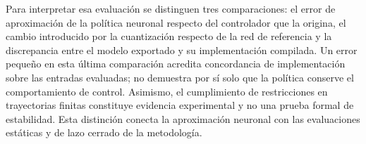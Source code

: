 Para interpretar esa evaluación se distinguen tres comparaciones: el error de aproximación de la política neuronal respecto del controlador que la origina, el cambio introducido por la cuantización respecto de la red de referencia y la discrepancia entre el modelo exportado y su implementación compilada. Un error pequeño en esta última comparación acredita concordancia de implementación sobre las entradas evaluadas; no demuestra por sí solo que la política conserve el comportamiento de control. Asimismo, el cumplimiento de restricciones en trayectorias finitas constituye evidencia experimental y no una prueba formal de estabilidad. Esta distinción conecta la aproximación neuronal con las evaluaciones estáticas y de lazo cerrado de la metodología.
